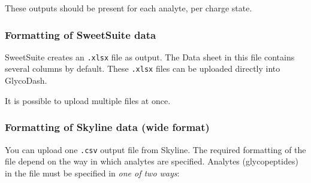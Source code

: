 These outputs should be present for each analyte, per charge state.

\subsubsection{Formatting of SweetSuite data}
SweetSuite creates an \texttt{.xlsx} file as output.
The \textsf{Data} sheet in this file contains several columns by default.
These \texttt{.xlsx} files can be uploaded directly into GlycoDash.

It is possible to upload multiple files at once.


\newpage
\subsubsection{Formatting of Skyline data (wide format)}
You can upload one \texttt{.csv} output file from Skyline.
The required formatting of the file depend on the way in which analytes are specified.
Analytes (glycopeptides) in the file must be specified in \emph{one of two ways}:

